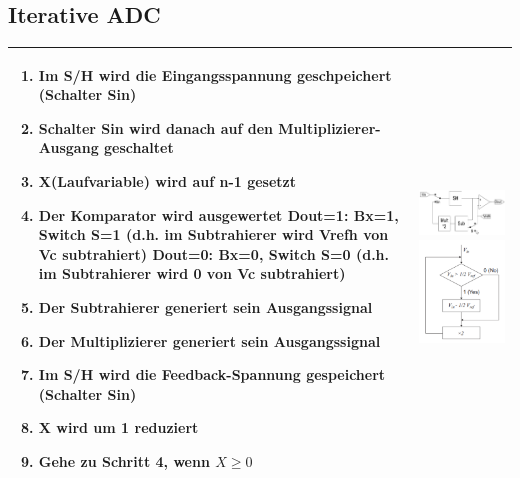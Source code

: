 \subsection{Iterative ADC}
\begin{longtable}{|p{12cm}|p{6cm}|}
  \hline
    \begin{enumerate}
      \item Im S/H wird die Eingangsspannung geschpeichert (Schalter Sin)
      \item Schalter Sin wird danach auf den Multiplizierer-Ausgang geschaltet
      \item X(Laufvariable) wird auf n-1 gesetzt
      \item Der Komparator wird ausgewertet\newline
        Dout=1: Bx=1, Switch S=1 (d.h. im Subtrahierer wird Vrefh von Vc
        subtrahiert)\newline
        Dout=0: Bx=0, Switch S=0 (d.h. im Subtrahierer wird 0 von Vc
        subtrahiert)
      \item Der Subtrahierer generiert sein Ausgangssignal
      \item Der Multiplizierer generiert sein Ausgangssignal
      \item Im S/H wird die Feedback-Spannung gespeichert (Schalter Sin)
      \item X wird um 1 reduziert
      \item Gehe zu Schritt 4, wenn $X\geq0$
    \end{enumerate} &
    \includegraphics[width=6cm, valign=t]{pictures/iterativeADC}\newline
    \includegraphics[width=6cm, valign=t]{pictures/iterativeADC_ablauf}\\
  \hline
\end{longtable}




